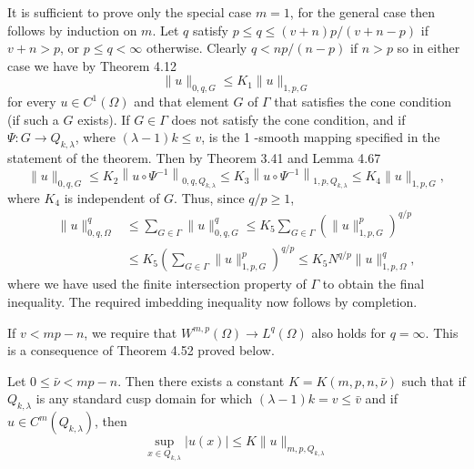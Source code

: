 \begin{para}
  It is sufficient to prove only the special case $m=1$, for the general case then follows by induction on $m$. Let $q$ satisfy $p \leq q \leq(v+n) p /(v+n-p)$ if $v+n>p$, or $p \leq q<\infty$ otherwise. Clearly $q<n p /(n-p)$ if $n>p$ so in either case we have by Theorem 4.12
  \[
  \|u\|_{0, q, G} \leq K_1\|u\|_{1, p, G}
  \]
  for every $u \in C^1(\Omega)$ and that element $G$ of $\Gamma$ that satisfies the cone condition (if such a $G$ exists). If $G \in \Gamma$ does not satisfy the cone condition, and if $\Psi: G \rightarrow Q_{k, \lambda}$, where $(\lambda-1) k \leq v$, is the 1 -smooth mapping specified in the statement of the theorem. Then by Theorem 3.41 and Lemma 4.67
  \[
  \|u\|_{0, q, G} \leq K_2\left\|u \circ \Psi^{-1}\right\|_{0, q, Q_{k, \lambda}} \leq K_3\left\|u \circ \Psi^{-1}\right\|_{1, p, Q_{k, \lambda}} \leq K_4\|u\|_{1, p, G},
  \]
  where $K_4$ is independent of $G$. Thus, since $q / p \geq 1$,
  \[
  \begin{aligned}
  \|u\|_{0, q, \Omega}^q & \leq \sum_{G \in \Gamma}\|u\|_{0, q, G}^q \leq K_5 \sum_{G \in \Gamma}\left(\|u\|_{1, p, G}^p\right)^{q / p} \\
  & \leq K_5\left(\sum_{G \in \Gamma}\|u\|_{1, p, G}^p\right)^{q / p} \leq K_5 N^{q / p}\|u\|_{1, p, \Omega}^q,
  \end{aligned}
  \]
  where we have used the finite intersection property of $\Gamma$ to obtain the final inequality. The required imbedding inequality now follows by completion.
  
  If $v<m p-n$, we require that $W^{m,p}(\Omega) \rightarrow L^q(\Omega)$ also holds for $q=\infty$. This is a consequence of Theorem 4.52 proved below.
\end{para}


\begin{lemma}
  Let $0 \leq \bar{\nu}<m p-n$. Then there exists a constant $K=K(m, p, n, \bar{\nu})$ 
  such that if $Q_{k, \lambda}$ is any standard cusp domain for which $(\lambda-1) k=v \leq \bar{v}$
  and if $u \in C^m\left(Q_{k, \lambda}\right)$, then
  \[
  \sup _{x \in Q_{k, \lambda}}|u(x)| \leq K\|u\|_{m, p, Q_{k, \lambda}}
  \]
\end{lemma}


